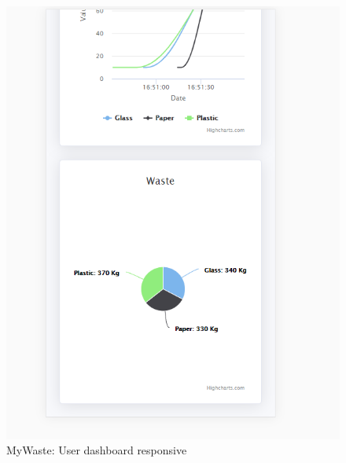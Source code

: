 \documentclass{report}
\begin{document}
\begin{figure}[h!]
    \begin{center}
        \includegraphics[width=1.0\textwidth]{images/userDashboard_resp2.PNG}  \end{center}
    \caption{MyWaste: User dashboard responsive}
    \label{fig:respuserdash2}
\end{figure}
\end{document}
